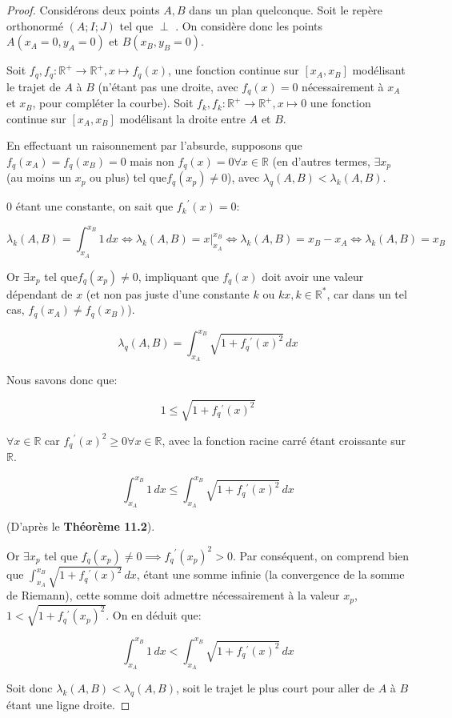 \documentclass{amsart}
\theoremstyle{definition}
\theoremstyle{remark}
\numberwithin{equation}{section}
\renewcommand*{\overrightarrow}[1]{\vbox{\halign{##\cr 
  \tiny\rightarrowfill\cr\noalign{\nointerlineskip\vskip1pt} 
  $#1\mskip2mu$\cr}}}
\begin{document}
\begin{proof}
  Considérons deux points $A,B$ dans un plan quelconque. Soit le repère orthonormé $(A;I;J)$ tel que \overrightarrow{AJ} $\perp$ \overrightarrow{AB}. On considère donc les points $A(x_A=0,y_A=0)$ et $B(x_B,y_B=0)$.

  Soit $f_q, f_q:\mathbb{R^+}\longrightarrow \mathbb{R^+}, x\longmapsto f_q(x)$, une fonction continue sur $[x_A,x_B]$ modélisant le trajet de $A$ à $B$ (n'étant pas une droite, avec $f_q(x)=0$ nécessairement à $x_A$ et $x_B$, pour compléter la courbe). Soit $f_k, f_k:\mathbb{R^+}\longrightarrow \mathbb{R^+}, x\longmapsto 0$ une fonction
  continue sur $[x_A,x_B]$ modélisant la droite entre $A$ et $B$.

  En effectuant un raisonnement par l'absurde, supposons que $f_q(x_A)=f_q(x_B)=0$ mais non $f_q(x)=0 \forall x\in\mathbb{R}$ (en d'autres termes, $\exists x_p$ (au moins un $x_p$ ou plus) tel que$f_q(x_p)\ne0$), avec $\lambda_q(A,B) < \lambda_k(A,B)$.

  $0$ étant une constante, on sait que ${f_k}^\prime(x)=0$:

  \[\lambda_k(A,B)=\int_{x_A}^{x_B}1 \,dx \Leftrightarrow \lambda_k(A,B)=x\Biggr|_{x_A}^{x_B} \Leftrightarrow \lambda_k(A,B)= x_B-x_A \Leftrightarrow \lambda_k(A,B)= x_B\]

  Or $\exists x_p$ tel que$f_q(x_p)\ne0$, impliquant que $f_q(x)$ doit avoir une valeur dépendant de $x$ (et non pas juste d'une constante $k$ ou $kx, k\in\mathbb{R^*}$, car dans un tel cas, $f_q(x_A)\ne f_q(x_B)$).

  \[\lambda_q(A,B)=\int_{x_A}^{x_B}\sqrt{1+f_q{^\prime}(x)^2} \,dx\]

  Nous savons donc que:

  \[1 \leq \sqrt{1+f_q{^\prime}(x)^2}\]

  $\forall x \in \mathbb{R}$ car $f_q{^\prime}(x)^2\geq 0 \forall x \in \mathbb{R}$, avec la fonction racine carré étant croissante sur $\mathbb{R}$.

  \[\int_{x_A}^{x_B}1 \,dx \leq \int_{x_A}^{x_B}\sqrt{1+f_q{^\prime}(x)^2} \,dx\]

  (D'après le \textbf{Théorème 11.2}).

  Or $\exists x_p$ tel que $f_q(x_p)\ne0 \implies {{f_q}^\prime(x_p)}^2>0$. Par conséquent, on comprend bien que $\int_{x_A}^{x_B}\sqrt{1+f_q{^\prime}(x)^2} \,dx$, étant une somme infinie (la convergence de la somme de Riemann), cette somme doit admettre nécessairement à la valeur $x_p$, $1<\sqrt{1+{f_q{^\prime}(x_p)}^2}$. On en déduit que:

  \[ \int_{x_A}^{x_B}1 \,dx < \int_{x_A}^{x_B}\sqrt{1+f_q{^\prime}(x)^2} \,dx\]

  Soit donc $\lambda_k(A,B) < \lambda_q(A,B)$, soit le trajet le plus court pour aller de $A$ à $B$ étant une ligne droite.
\end{proof}
\end{document}
